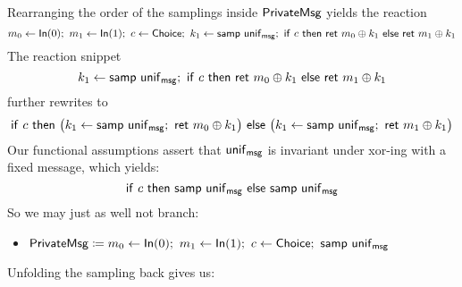 \noindent Rearranging the order of the samplings inside $\mathsf{PrivateMsg}$ yields the reaction
\[m_0 \leftarrow \In(0); \ m_1 \leftarrow \In(1); \ c \leftarrow \Choice; \ k_1 \leftarrow \samp{\unif_\msg}; \ \ifte{c}{\ret{m_0 \oplus k_1}}{\ret{m_1 \oplus k_1}}\]
The reaction snippet
\[k_1 \leftarrow \mathsf{samp} \ \mathsf{unif}_{\mathsf{msg}}; \ \mathsf{if} \ c \ \mathsf{then} \ \mathsf{ret} \ m_0 \oplus k_1 \ \mathsf{else} \ \mathsf{ret} \ m_1 \oplus k_1\]
further rewrites to
\[\ifte{c}{\big(k_1 \leftarrow \samp{\unif_\msg}; \ \ret{m_0 \oplus k_1}\big)}{\big(k_1 \leftarrow \samp{\unif_\msg}; \ \ret{m_1 \oplus k_1}\big)}\]
Our functional assumptions assert that $\mathsf{unif}_{\mathsf{msg}}$ is invariant under xor-ing with a fixed message, which yields:
\[\mathsf{if} \ c \ \mathsf{then} \ \mathsf{samp} \ \mathsf{unif}_{\mathsf{msg}} \ \mathsf{else} \ \mathsf{samp} \ \mathsf{unif}_{\mathsf{msg}}\]
So we may just as well not branch:
\begin{itemize}
\item $\PrivateMsg \coloneqq m_0 \leftarrow \In(0); \ m_1 \leftarrow \In(1); \ c \leftarrow \Choice; \ \samp{\unif_\msg}$
\end{itemize}
Unfolding the sampling back gives us:

